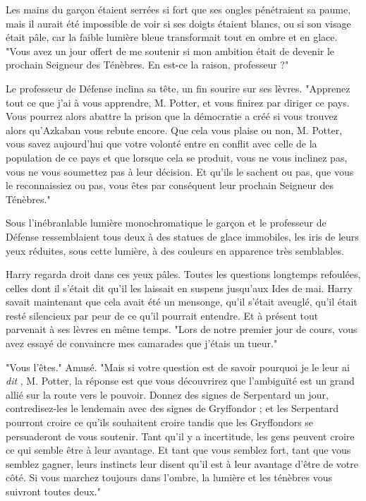 Les mains du garçon étaient serrées si fort que ses ongles pénétraient sa paume, mais il aurait été impossible de voir si ses doigts étaient blancs, ou si son visage était pâle, car la faible lumière bleue transformait tout en ombre et en glace. "Vous avez un jour offert de me soutenir si mon ambition était de devenir le prochain Seigneur des Ténèbres. En est-ce la raison, professeur ?"

Le professeur de Défense inclina sa tête, un fin sourire sur ses lèvres. "Apprenez tout ce que j'ai à vous apprendre, M. Potter, et vous finirez par diriger ce pays. Vous pourrez alors abattre la prison que la démocratie a créé si vous trouvez alors qu'Azkaban vous rebute encore. Que cela vous plaise ou non, M. Potter, vous savez aujourd'hui que votre volonté entre en conflit avec celle de la population de ce pays et que lorsque cela se produit, vous ne vous inclinez pas, vous ne vous soumettez pas à leur décision. Et qu'ils le sachent ou pas, que vous le reconnaissiez ou pas, vous êtes par conséquent leur prochain Seigneur des Ténèbres."

Sous l'inébranlable lumière monochromatique le garçon et le professeur de Défense ressemblaient tous deux à des statues de glace immobiles, les iris de leurs yeux réduites, sous cette lumière, à des couleurs en apparence très semblables.

Harry regarda droit dans ces yeux pâles. Toutes les questions longtemps refoulées, celles dont il s'était dit qu'il les laissait en suspens jusqu'aux Ides de mai. Harry savait maintenant que cela avait été un mensonge, qu'il s'était aveuglé, qu'il était resté silencieux par peur de ce qu'il pourrait entendre. Et à présent tout parvenait à ses lèvres en même temps. "Lors de notre premier jour de cours, vous avez essayé de convaincre mes camarades que j'étais un tueur."

"Vous l'êtes." Amusé. "Mais si votre question est de savoir pourquoi je le leur ai \emph{dit} , M. Potter, la réponse est que vous découvrirez que l'ambiguïté est un grand allié sur la route vers le pouvoir. Donnez des signes de Serpentard un jour, contredisez-les le lendemain avec des signes de Gryffondor ; et les Serpentard pourront croire ce qu'ils souhaitent croire tandis que les Gryffondors se persuaderont de vous soutenir. Tant qu'il y a incertitude, les gens peuvent croire ce qui semble être à leur avantage. Et tant que vous semblez fort, tant que vous semblez gagner, leurs instincts leur disent qu'il est à leur avantage d'être de votre côté. Si vous marchez toujours dans l'ombre, la lumière et les ténèbres vous suivront toutes deux."

